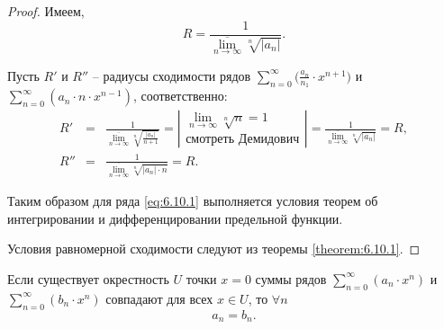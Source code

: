 \begin{proof}
    Имеем,
    \[
        R = \frac{1}{\underset{n\rightarrow\infty}{\overline{\lim}}\sqrt[n]{|a_n|}}.
    \]

    Пусть $R'$ и $R''$ -- радиусы сходимости рядов $\sum_{n=0}^{\infty}\big(\frac{a_n}{n_1} \cdot x^{n+1}\big)$ и \\ $\sum_{n=0}^{\infty}(a_n \cdot n \cdot x^{n-1})$, соответственно:
    \begin{eqnarray*}
        R' & = & \frac{1}{\underset{n\rightarrow\infty}{\overline{\lim}}\sqrt[n]{\frac{|a_n|}{n+1}}} = \left|\begin{array}{l}
            \underset{n\rightarrow\infty}{\lim}\sqrt[n]{n} = 1 \\
            \text{смотреть Демидович}
        \end{array}\right| = \frac{1}{\underset{n\rightarrow\infty}{\overline{\lim}}\sqrt[n]{| a_n | }} = R, \\
        R'' & = & \frac{1}{\underset{n\rightarrow\infty}{\overline{\lim}}\sqrt[n]{|a_n|\cdot n}} = R.
    \end{eqnarray*}

    Таким образом для ряда \ref{eq:6.10.1} выполняется условия теорем об интегрировании и дифференцировании предельной функции.

    Условия равномерной сходимости следуют из теоремы \ref{theorem:6.10.1}.
\end{proof}

\begin{theorem}[Об единственности]
    Если существует окрестность $U$ точки $x = 0$ суммы рядов $\sum_{n=0}^{\infty}(a_n \cdot x^n)$ и $\sum_{n=0}^{\infty}(b_n \cdot x^n)$ совпадают для всех $x \in U$, то $\forall n $
    \[
        a_n = b_n.
    \]
\end{theorem}

